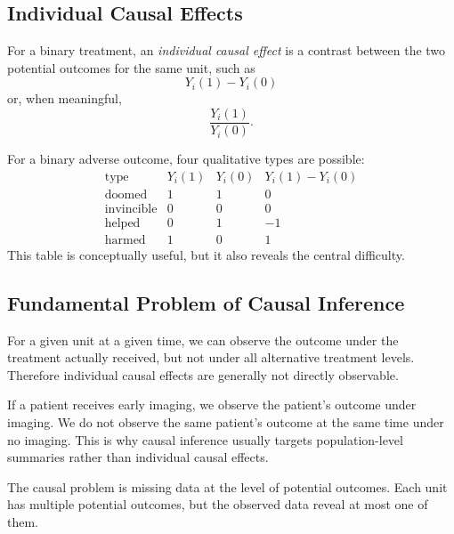 \subsection{Individual Causal Effects}

\begin{definition}
For a binary treatment, an \emph{individual causal effect} is a contrast between the two potential outcomes for the same unit, such as
\[
Y_i(1)-Y_i(0)
\]
or, when meaningful,
\[
\frac{Y_i(1)}{Y_i(0)}.
\]
\end{definition}

For a binary adverse outcome, four qualitative types are possible:
\[
\begin{array}{c|ccc}
\text{type} & Y_i(1) & Y_i(0) & Y_i(1)-Y_i(0)\\
\hline
\text{doomed} & 1 & 1 & 0\\
\text{invincible} & 0 & 0 & 0\\
\text{helped} & 0 & 1 & -1\\
\text{harmed} & 1 & 0 & 1
\end{array}
\]
This table is conceptually useful, but it also reveals the central difficulty.

\subsection{Fundamental Problem of Causal Inference}

\begin{definition}
For a given unit at a given time, we can observe the outcome under the treatment actually received, but not under all alternative treatment levels. Therefore individual causal effects are generally not directly observable.
\end{definition}

If a patient receives early imaging, we observe the patient's outcome under imaging. We do not observe the same patient's outcome at the same time under no imaging. This is why causal inference usually targets population-level summaries rather than individual causal effects.

\begin{keyidea}
The causal problem is missing data at the level of potential outcomes. Each unit has multiple potential outcomes, but the observed data reveal at most one of them.
\end{keyidea}
